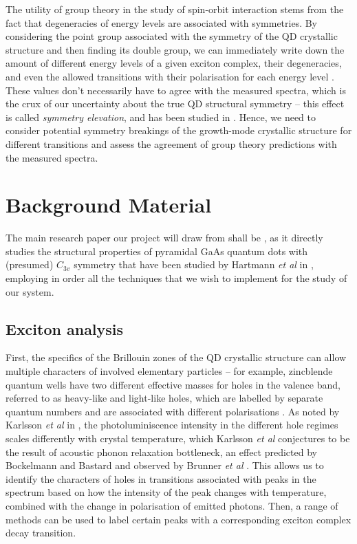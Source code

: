 \documentclass[12pt]{article}
\begin{document}
The utility of group theory in the study of spin-orbit interaction stems from the fact that degeneracies of energy levels are associated with symmetries. By considering the point group associated with the symmetry of the QD crystallic structure and then finding its double group, we can immediately write down the amount of different energy levels of a given exciton complex, their degeneracies, and even the allowed transitions with their polarisation for each energy level \cite[Ch. 19]{dresselhaus}. These values don't necessarily have to agree with the measured spectra, which is the crux of our uncertainty about the true QD structural symmetry -- this effect is called \textit{symmetry elevation}, and has been studied in \cite{karlsson2}. Hence, we need to consider potential symmetry breakings of the growth-mode crystallic structure for different transitions and assess the agreement of group theory predictions with the measured spectra.

\section{Background Material}

The main research paper our project will draw from shall be \cite{karlsson}, as it directly studies the structural properties of pyramidal GaAs quantum dots with (presumed) $C_{3v}$ symmetry that have been studied by Hartmann \textit{et al} in \cite{pyramidal_qds}, employing in order all the techniques that we wish to implement for the study of our system.

\subsection{Exciton analysis}
First, the specifics of the Brillouin zones of the QD crystallic structure can allow multiple characters of involved elementary particles -- for example, zincblende quantum wells have two different effective masses for holes in the valence band, referred to as heavy-like and light-like holes, which are labelled by separate quantum numbers and are associated with different polarisations \cite{karlsson2}. As noted by Karlsson \textit{et al} in \cite{karlsson}, the photoluminiscence intensity in the different hole regimes scales differently with crystal temperature, which Karlsson \textit{et al} conjectures to be the result of acoustic phonon relaxation bottleneck, an effect predicted by Bockelmann and Bastard \cite{bastard} and observed by Brunner \textit{et al} \cite{brunner}. This allows us to identify the characters of holes in transitions associated with peaks in the spectrum based on how the intensity of the peak changes with temperature, combined with the change in polarisation of emitted photons. Then, a range of methods can be used to label certain peaks with a corresponding exciton complex decay transition.
\end{document}
